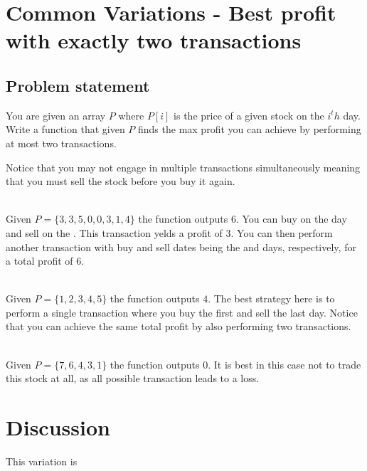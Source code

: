 \section{Common Variations - Best profit with exactly two transactions}
\label{sec:buy_sell_stocks3:intro}

\subsection{Problem statement}
\begin{exercise}
	You are given an array $P$ where $P[i]$ is the price of a given stock on the $i^th$ day.
	Write a function that given $P$ finds the max profit you can achieve by performing at most two transactions.
		
	Notice that you may not engage in multiple transactions simultaneously meaning that you must sell the stock before you buy it again.
	
	 
	\begin{example}
	\label{ex:buy_sell_stocks_3:exmaple1}
		\hfill \\
		Given $P=\{3,3,5,0,0,3,1,4\}$ the function outputs $6$. 
		You can buy on the  day and sell on the . This transaction yelds a profit of $3$.
		You can then perform another transaction with buy and sell dates being the  and  days, respectively, for a total profit of $6$.
	\end{example}

	\begin{example}
		\label{ex:buy_sell_stocks_3:exmaple2}
			\hfill \\
			Given $P=\{1,2,3,4,5\}$ the function outputs $4$. 
			The best strategy here is to perform a single transaction where you buy the first and sell the last day. Notice that you can achieve the same total profit by also performing two transactions.
	\end{example}

	\begin{example}
		\label{ex:buy_sell_stocks_3:exmaple3}
			\hfill \\
			Given $P=\{7,6,4,3,1\}$ the function outputs $0$. 
			It is best in this case not to trade this stock at all, as all possible transaction leads to a loss.
	\end{example}
\end{exercise}


\section{Discussion}
\label{buy_sell_stocks_3:sec:discussion}
This variation is 


